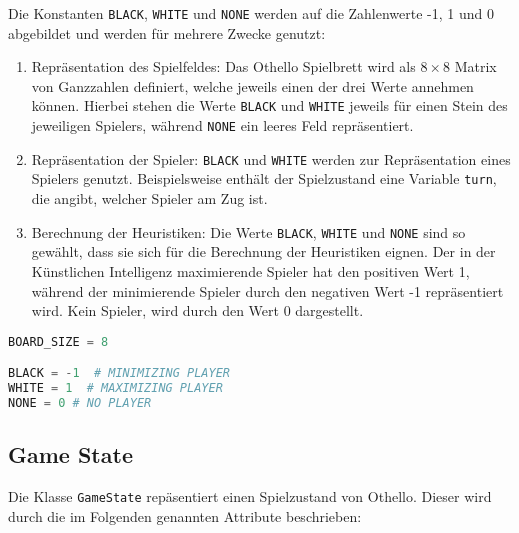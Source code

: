 Die Konstanten \passthrough{\lstinline!BLACK!},
\passthrough{\lstinline!WHITE!} und \passthrough{\lstinline!NONE!}
werden auf die Zahlenwerte -1, 1 und 0 abgebildet und werden für mehrere
Zwecke genutzt:

\begin{enumerate}
\def\labelenumi{\arabic{enumi}.}
\tightlist
\item
  Repräsentation des Spielfeldes: Das Othello Spielbrett wird als
  \(8\times 8\) Matrix von Ganzzahlen definiert, welche jeweils einen
  der drei Werte annehmen können. Hierbei stehen die Werte
  \passthrough{\lstinline!BLACK!} und \passthrough{\lstinline!WHITE!}
  jeweils für einen Stein des jeweiligen Spielers, während
  \passthrough{\lstinline!NONE!} ein leeres Feld repräsentiert.
\item
  Repräsentation der Spieler: \passthrough{\lstinline!BLACK!} und
  \passthrough{\lstinline!WHITE!} werden zur Repräsentation eines
  Spielers genutzt. Beispielsweise enthält der Spielzustand eine
  Variable \passthrough{\lstinline!turn!}, die angibt, welcher Spieler
  am Zug ist.
\item
  Berechnung der Heuristiken: Die Werte \passthrough{\lstinline!BLACK!},
  \passthrough{\lstinline!WHITE!} und \passthrough{\lstinline!NONE!}
  sind so gewählt, dass sie sich für die Berechnung der Heuristiken
  eignen. Der in der Künstlichen Intelligenz maximierende Spieler hat
  den positiven Wert 1, während der minimierende Spieler durch den
  negativen Wert -1 repräsentiert wird. Kein Spieler, wird durch den
  Wert 0 dargestellt.
\end{enumerate}

\begin{lstlisting}[language=Python]
BOARD_SIZE = 8

BLACK = -1  # MINIMIZING PLAYER
WHITE = 1  # MAXIMIZING PLAYER
NONE = 0 # NO PLAYER
\end{lstlisting}

\hypertarget{game-state}{%
\subsection{Game State}\label{game-state}}

Die Klasse \passthrough{\lstinline!GameState!} repäsentiert einen
Spielzustand von Othello. Dieser wird durch die im Folgenden genannten
Attribute beschrieben:

